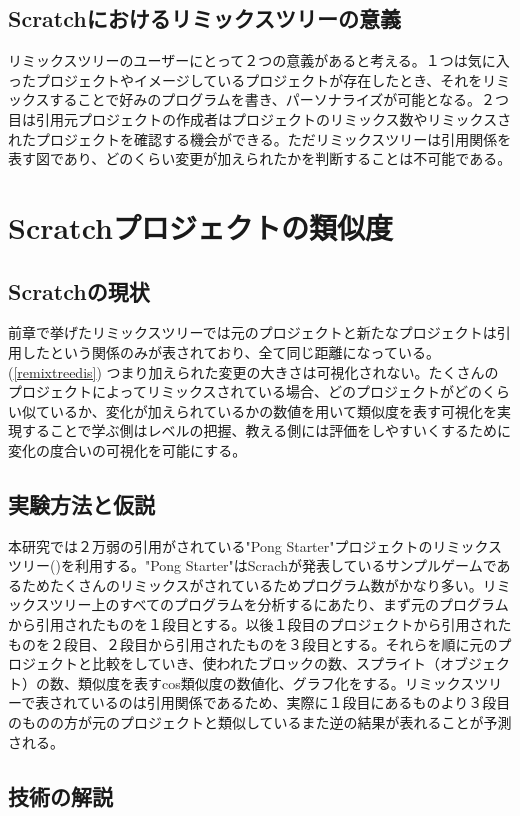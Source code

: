 \documentclass[a4paper,10pt,onecolumn,oneside,openany]{jsbook}
\begin{document}
\section{Scratchにおけるリミックスツリーの意義}
リミックスツリーのユーザーにとって２つの意義があると考える。１つは気に入ったプロジェクトやイメージしているプロジェクトが存在したとき、それをリミックスすることで好みのプログラムを書き、パーソナライズが可能となる。２つ目は引用元プロジェクトの作成者はプロジェクトのリミックス数やリミックスされたプロジェクトを確認する機会ができる。ただリミックスツリーは引用関係を表す図であり、どのくらい変更が加えられたかを判断することは不可能である。



\chapter{Scratchプロジェクトの類似度}
\section{Scratchの現状}
前章で挙げたリミックスツリーでは元のプロジェクトと新たなプロジェクトは引用したという関係のみが表されており、全て同じ距離になっている。(\ref{remixtreedis})
つまり加えられた変更の大きさは可視化されない。たくさんのプロジェクトによってリミックスされている場合、どのプロジェクトがどのくらい似ているか、変化が加えられているかの数値を用いて類似度を表す可視化を実現することで学ぶ側はレベルの把握、教える側には評価をしやすいくするために変化の度合いの可視化を可能にする。
 \section{実験方法と仮説}
本研究では２万弱の引用がされている"Pong Starter"プロジェクトのリミックスツリー(\cite{pongret})を利用する。"Pong Starter"はScrachが発表しているサンプルゲームであるためたくさんのリミックスがされているためプログラム数がかなり多い。リミックスツリー上のすべてのプログラムを分析するにあたり、まず元のプログラムから引用されたものを１段目とする。以後１段目のプロジェクトから引用されたものを２段目、２段目から引用されたものを３段目とする。それらを順に元のプロジェクトと比較をしていき、使われたブロックの数、スプライト（オブジェクト）の数、類似度を表すcos類似度の数値化、グラフ化をする。リミックスツリーで表されているのは引用関係であるため、実際に１段目にあるものより３段目のものの方が元のプロジェクトと類似しているまた逆の結果が表れることが予測される。
\newpage
 \section{技術の解説}
\end{document}
